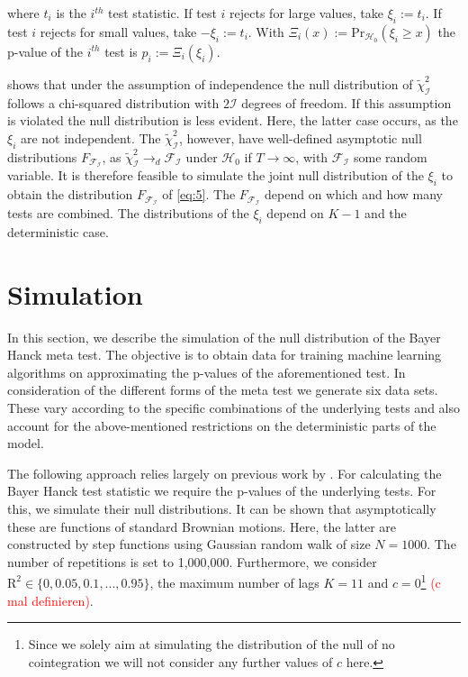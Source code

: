 \documentclass[12pt,a4paper]{article}
\let\rmarkdownfootnote\footnote%
\def\footnote{\protect\rmarkdownfootnote}
\begin{document}
where \(t_i\) is the \(i^{th}\) test statistic. If test \(i\) rejects
for large values, take \(\xi_i := t_i\). If test \(i\) rejects for small
values, take \(-\xi_i := t_i\). With
\(\Xi_i(x) := \text{Pr}_{\mathcal{H_0}}(\xi_i \geq x)\) the p-value of
the \(i^{th}\) test is \(p_i := \Xi_i(\xi_i)\).

\textcite{Fisher_1932} shows that under the assumption of independence
the null distribution of \(\tilde{\chi}^2_{\mathcal{I}}\) follows a
chi-squared distribution with \(2\mathcal{I}\) degrees of freedom. If
this assumption is violated the null distribution is less evident. Here,
the latter case occurs, as the \(\xi_i\) are not independent. The
\(\tilde{\chi}^2_{\mathcal{I}}\), however, have well-defined asymptotic
null distributions \(F_{\mathcal{F_I}}\), as
\(\tilde{\chi}^2_{\mathcal{I}} \rightarrow_d \mathcal{F_I}\) under
\(\mathcal{H}_0\) if \(T \rightarrow \infty\), with \(\mathcal{F_I}\)
some random variable. It is therefore feasible to simulate the joint
null distribution of the \(\xi_i\) to obtain the distribution
\(F_{\mathcal{F_I}}\) of \eqref{eq:5}. The \(F_{\mathcal{F_I}}\) depend
on which and how many tests are combined. The distributions of the
\(\xi_i\) depend on \(K-1\) and the deterministic case.

\hypertarget{simulation}{%
\section{Simulation}\label{simulation}}

In this section, we describe the simulation of the null distribution of
the Bayer Hanck meta test. The objective is to obtain data for training
machine learning algorithms on approximating the p-values of the
aforementioned test. In consideration of the different forms of the meta
test we generate six data sets. These vary according to the specific
combinations of the underlying tests and also account for the
above-mentioned restrictions on the deterministic parts of the model.

The following approach relies largely on previous work by
\textcite{Pesavento_2004}. For calculating the Bayer Hanck test
statistic we require the p-values of the underlying tests. For this, we
simulate their null distributions. It can be shown that asymptotically
these are functions of standard Brownian motions. Here, the latter are
constructed by step functions using Gaussian random walk of size
\(N = 1000\). The number of repetitions is set to 1,000,000.
Furthermore, we consider \(\text{R}^2 \in \{0, 0.05, 0.1, ..., 0.95\}\),
the maximum number of lags \(K = 11\) and \(c = 0\)\footnote{Since we
  solely aim at simulating the distribution of the null of no
  cointegration we will not consider any further values of \(c\) here.}
\textcolor{red}{(c mal definieren)}.
\end{document}
